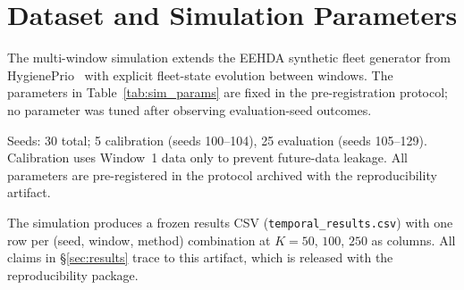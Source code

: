 \section{Dataset and Simulation Parameters}

The multi-window simulation extends the EEHDA synthetic fleet generator from HygienePrio~\cite{paper4hygieneprio} with explicit fleet-state evolution between windows. The parameters in Table~\ref{tab:sim_params} are fixed in the pre-registration protocol; no parameter was tuned after observing evaluation-seed outcomes.



Seeds: 30 total; 5 calibration (seeds 100--104), 25 evaluation (seeds 105--129). Calibration uses Window~1 data only to prevent future-data leakage. All parameters are pre-registered in the protocol archived with the reproducibility artifact.

The simulation produces a frozen results CSV (\texttt{temporal\_results.csv}) with one row per (seed, window, method) combination at $K=50$, $100$, $250$ as columns. All claims in \S\ref{sec:results} trace to this artifact, which is released with the reproducibility package.
